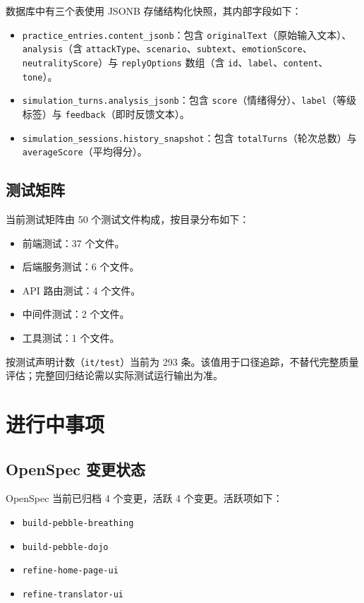数据库中有三个表使用 JSONB 存储结构化快照，其内部字段如下：

\begin{itemize}
  \item \texttt{practice\_entries.content\_jsonb}：包含 \texttt{originalText}（原始输入文本）、\texttt{analysis}（含 \texttt{attackType}、\texttt{scenario}、\texttt{subtext}、\texttt{emotionScore}、\texttt{neutralityScore}）与 \texttt{replyOptions} 数组（含 \texttt{id}、\texttt{label}、\texttt{content}、\texttt{tone}）。
  \item \texttt{simulation\_turns.analysis\_jsonb}：包含 \texttt{score}（情绪得分）、\texttt{label}（等级标签）与 \texttt{feedback}（即时反馈文本）。
  \item \texttt{simulation\_sessions.history\_snapshot}：包含 \texttt{totalTurns}（轮次总数）与 \texttt{averageScore}（平均得分）。
\end{itemize}

\subsection{测试矩阵}

当前测试矩阵由 50 个测试文件构成，按目录分布如下：

\begin{itemize}
  \item 前端测试：37 个文件。
  \item 后端服务测试：6 个文件。
  \item API 路由测试：4 个文件。
  \item 中间件测试：2 个文件。
  \item 工具测试：1 个文件。
\end{itemize}

按测试声明计数（\texttt{it/test}）当前为 293 条。该值用于口径追踪，不替代完整质量评估；完整回归结论需以实际测试运行输出为准。

\section{进行中事项}

\subsection{OpenSpec 变更状态}

OpenSpec 当前已归档 4 个变更，活跃 4 个变更。活跃项如下：

\begin{itemize}
  \item \texttt{build-pebble-breathing}
  \item \texttt{build-pebble-dojo}
  \item \texttt{refine-home-page-ui}
  \item \texttt{refine-translator-ui}
\end{itemize}

